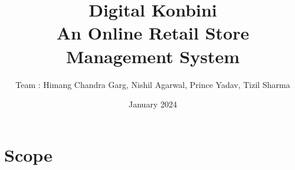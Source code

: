 \documentclass{article}
\title{\textbf{Digital Konbini \\ An Online Retail Store Management System}}
\author{ Team : Himang Chandra Garg, Nishil Agarwal, Prince Yadav, Tizil Sharma}
\date{January 2024}
\begin{document}
\maketitle

\section{Scope}

\end{document}
